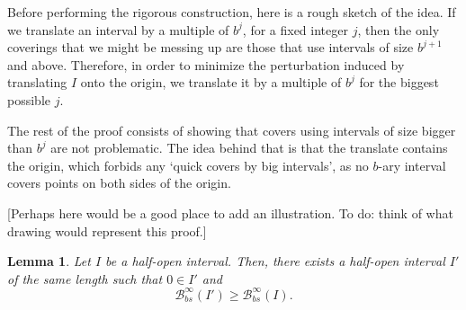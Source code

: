 \documentclass[11pt, reqno]{amsart}
\newcommand{\BB}{\mathcal{B}}
\newtheorem{lemma}{Lemma}
\begin{document}
Before performing the rigorous construction, here is a rough sketch of the idea. If we translate an interval by a multiple of $b^j$, for a fixed integer $j$, then the only coverings that we might be messing up are those that use intervals of size $b^{j+1}$ and above. Therefore, in order to minimize the perturbation induced by translating $I$ onto the origin, we translate it by a multiple of $b^j$ for the biggest possible $j$.

The rest of the proof consists of showing that covers using intervals of size bigger than $b^j$ are not problematic. The idea behind that is that the translate contains the origin, which forbids any `quick covers by big intervals', as no $b$-ary interval covers points on both sides of the origin.

[Perhaps here would be a good place to add an illustration. To do: think of what drawing would represent this proof.]

\begin{lemma}
Let $I$ be a half-open interval. Then, there exists a half-open interval $I'$ of the same length such that $0 \in I'$ and
\[\BB_{bs}^\infty(I') \geq \BB_{bs}^\infty(I).\]
\end{lemma}
\end{document}
